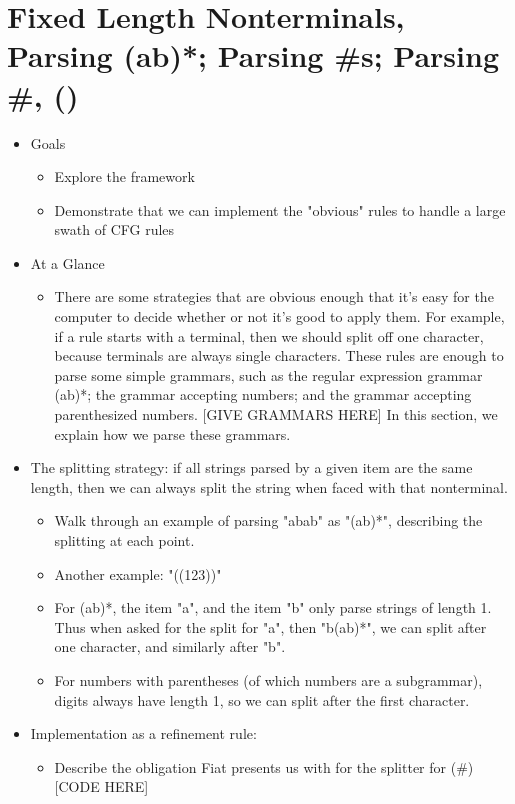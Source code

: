 \chapter{Fixed Length Nonterminals, Parsing (ab)*; Parsing \#s; Parsing \#, ()}
  \begin{itemize} \item  Goals
    \begin{itemize} \item  Explore the framework 
    \item  Demonstrate that we can implement the "obvious" rules to handle a large swath of CFG rules \end{itemize}
  \item  At a Glance
    \begin{itemize} \item  There are some strategies that are obvious enough that it's easy for the computer to decide whether or not it's good to apply them.  For example, if a rule starts with a terminal, then we should split off one character, because terminals are always single characters.  These rules are enough to parse some simple grammars, such as the regular expression grammar (ab)*; the grammar accepting numbers; and the grammar accepting parenthesized numbers.  {}[GIVE GRAMMARS HERE]  In this section, we explain how we parse these grammars. \end{itemize}
  \item  The splitting strategy: if all strings parsed by a given item are the same length, then we can always split the string when faced with that nonterminal.
    \begin{itemize} \item  Walk through an example of parsing "abab" as "(ab)*", describing the splitting at each point. 
    \item  Another example: "((123))" 
    \item  For (ab)*, the item "a", and the item "b" only parse strings of length 1.  Thus when asked for the split for "a", then "b(ab)*", we can split after one character, and similarly after "b".  
    \item  For numbers with parentheses (of which numbers are a subgrammar), digits always have length 1, so we can split after the first character. \end{itemize}
  \item  Implementation as a refinement rule:
    \begin{itemize} \item  Describe the obligation Fiat presents us with for the splitter for (\#) {}[CODE HERE] 

\end{itemize}
\end{itemize}
